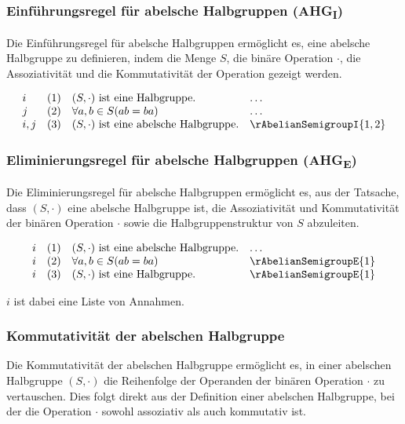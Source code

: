 \documentclass{book}
\theoremstyle{plain}
\theoremstyle{remark}
\theoremstyle{definition}
\begin{document}
\subsubsection*{Einführungsregel für abelsche Halbgruppen (AHG\textsubscript{I})}
\label{rule:rAbelianSemigroupI}
Die Einführungsregel für abelsche Halbgruppen ermöglicht es, eine abelsche Halbgruppe zu definieren, indem die Menge \(S\), die binäre Operation \(\cdot\), die Assoziativität und die Kommutativität der Operation gezeigt werden.


\[
\begin{array}{llll}
    i       & (1) &  (S, \cdot) \text{ ist eine Halbgruppe.} & \dots \\
    j       & (2) & \forall a, b \in S (ab = ba) & \dots \\
    i,j   & (3) & (S, \cdot) \text{ ist eine abelsche Halbgruppe.} & \rAbelianSemigroupI{1,2}
\end{array}
\]



\subsubsection*{Eliminierungsregel für abelsche Halbgruppen (AHG\textsubscript{E})}
\label{rule:rAbelianSemigroupE}
Die Eliminierungsregel für abelsche Halbgruppen ermöglicht es, aus der Tatsache, dass \((S, \cdot)\) eine abelsche Halbgruppe ist, die Assoziativität und Kommutativität der binären Operation \(\cdot\) sowie die Halbgruppenstruktur von \(S\) abzuleiten.

\[
\begin{array}{llll}
    i       & (1) &  (S, \cdot) \text{ ist eine abelsche Halbgruppe.} & \dots \\
    i       & (2) & \forall a, b \in S(ab = ba) & \rAbelianSemigroupE{1} \\
    i       & (3) & (S, \cdot) \text{ ist eine Halbgruppe.} & \rAbelianSemigroupE{1}
\end{array}
\]

\(i\) ist dabei eine Liste von Annahmen.

\subsubsection*{Kommutativität der abelschen Halbgruppe}
\label{rule:rCommutativeSemigroup}
Die Kommutativität der abelschen Halbgruppe ermöglicht es, in einer abelschen Halbgruppe \((S, \cdot)\) die Reihenfolge der Operanden der binären Operation \(\cdot\) zu vertauschen. Dies folgt direkt aus der Definition einer abelschen Halbgruppe, bei der die Operation \(\cdot\) sowohl assoziativ als auch kommutativ ist.
\end{document}
